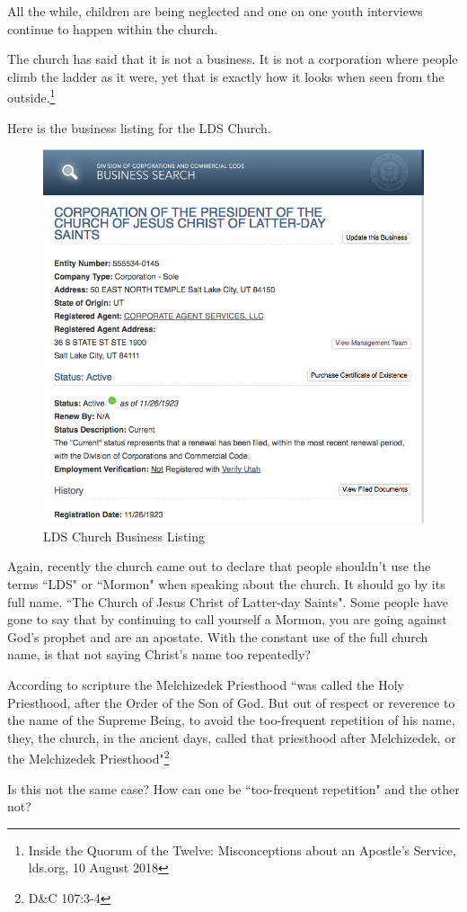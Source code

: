 All the while, children are being neglected and one on one youth interviews continue 
to happen within the church.

The church has said that it is not a business. It is not a corporation where people
climb the ladder as it were, yet that is exactly how it looks when seen from the
outside.\footnote{Inside the Quorum of the Twelve: Misconceptions about an Apostle's
Service, lds.org, 10 August 2018}

Here is the business listing for the LDS Church.

\begin{figure}[h!]
  \centering
  \includegraphics[width=1\linewidth]{articles/images/business.png}
  \caption{LDS Church Business Listing}
  \label{fig:business}
\end{figure}

Again, recently the church came out to declare that people shouldn't use the terms
``LDS" or ``Mormon" when speaking about the church. It should go by its full name.
``The Church of Jesus Christ of Latter-day Saints". Some people have gone to say that
by continuing to call yourself a Mormon, you are going against God's prophet and are
an apostate. With the constant use of the full church name, is that not saying
Christ's name too repeatedly?

According to scripture the Melchizedek Priesthood ``was called the Holy Priesthood, 
after the Order of the Son of God. But out of respect or reverence to the name of 
the Supreme Being, to avoid the too-frequent repetition of his name, 
they, the church, in the ancient days, called that priesthood after 
Melchizedek, or the Melchizedek Priesthood"\footnote{D\&C 107:3-4}

Is this not the same case? How can one be ``too-frequent repetition" and the other 
not?